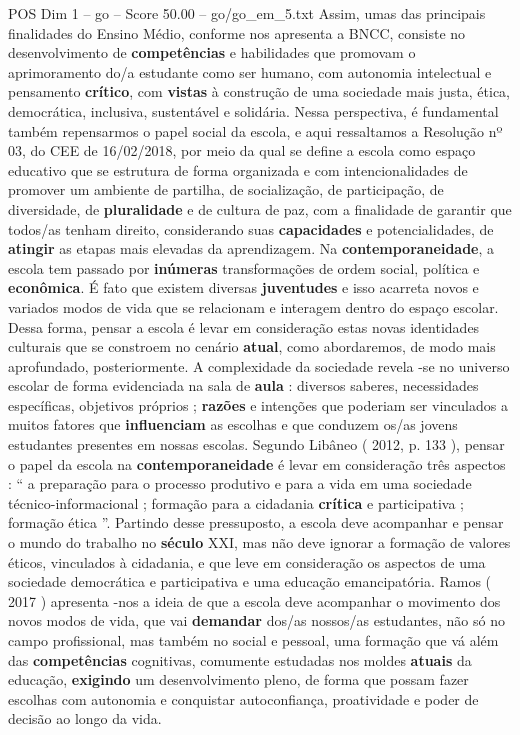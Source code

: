 \begin{textsample}{POS Dim 1 – go – Score 50.00 – go/go\_em\_5.txt}
Assim, umas das principais finalidades do Ensino Médio, conforme nos apresenta a BNCC, consiste no desenvolvimento de \textbf{competências} e habilidades que promovam o aprimoramento do/a estudante como ser humano, com autonomia intelectual e pensamento \textbf{crítico}, com \textbf{vistas} à construção de uma sociedade mais justa, ética, democrática, inclusiva, sustentável e solidária.
Nessa perspectiva, é fundamental também repensarmos o papel social da escola, e aqui ressaltamos a Resolução nº 03, do CEE de 16/02/2018, por meio da qual se define a escola como espaço educativo que se estrutura de forma organizada e com intencionalidades de promover um ambiente de partilha, de socialização, de participação, de diversidade, de \textbf{pluralidade} e de cultura de paz, com a finalidade de garantir que todos/as tenham direito, considerando suas \textbf{capacidades} e potencialidades, de \textbf{atingir} as etapas mais elevadas da aprendizagem.
Na \textbf{contemporaneidade}, a escola tem passado por \textbf{inúmeras} transformações de ordem social, política e \textbf{econômica}.
É fato que existem diversas \textbf{juventudes} e isso acarreta novos e variados modos de vida que se relacionam e interagem dentro do espaço escolar.
Dessa forma, pensar a escola é levar em consideração estas novas identidades culturais que se constroem no cenário \textbf{atual}, como abordaremos, de modo mais aprofundado, posteriormente.
A complexidade da sociedade revela -se no universo escolar de forma evidenciada na sala de \textbf{aula} : diversos saberes, necessidades específicas, objetivos próprios ; \textbf{razões} e intenções que poderiam ser vinculados a muitos fatores que \textbf{influenciam} as escolhas e que conduzem os/as jovens estudantes presentes em nossas escolas.
Segundo Libâneo ( 2012, p. 133 ), pensar o papel da escola na \textbf{contemporaneidade} é levar em consideração três aspectos : “ a preparação para o processo produtivo e para a vida em uma sociedade técnico-informacional ; formação para a cidadania \textbf{crítica} e participativa ; formação ética ”.
Partindo desse pressuposto, a escola deve acompanhar e pensar o mundo do trabalho no \textbf{século} XXI, mas não deve ignorar a formação de valores éticos, vinculados à cidadania, e que leve em consideração os aspectos de uma sociedade democrática e participativa e uma educação emancipatória.
Ramos ( 2017 ) apresenta -nos a ideia de que a escola deve acompanhar o movimento dos novos modos de vida, que vai \textbf{demandar} dos/as nossos/as estudantes, não só no campo profissional, mas também no social e pessoal, uma formação que vá além das \textbf{competências} cognitivas, comumente estudadas nos moldes \textbf{atuais} da educação, \textbf{exigindo} um desenvolvimento pleno, de forma que possam fazer escolhas com autonomia e conquistar autoconfiança, proatividade e poder de decisão ao longo da vida.

\end{textsample}
